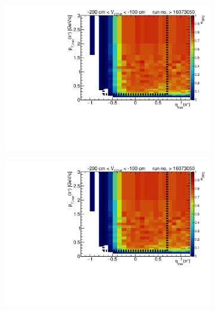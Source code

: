 \begin{figure}[h!]
	\centering
	\begin{subfigure}{.49\textwidth}
		\includegraphics[width=\textwidth,page=3]{chapters/chrgSTAR/img/tpcEffi/Eff2D_TPC_pion_Plus_RunRange2.pdf}
	\end{subfigure}
	\begin{subfigure}{.49\textwidth}
		\includegraphics[width=\textwidth,page=11]{chapters/chrgSTAR/img/tpcEffi/Eff2D_TPC_pion_Plus_RunRange2.pdf}
	\end{subfigure}
	\begin{subfigure}{.49\textwidth}

\end{subfigure}
\end{figure}
